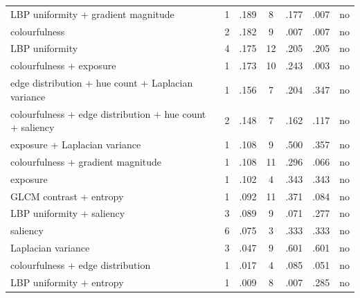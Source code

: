 \begin{table}[!ht]
\begin{tabular}{@{}>{\raggedright\arraybackslash}p{4.9cm}cccccc@{}}
LBP uniformity + gradient magnitude & 1 & .189 & 8 & .177 & .007 & no \\
colourfulness & 2 & .182 & 9 & .007 & .007 & no \\
LBP uniformity & 4 & .175 & 12 & .205 & .205 & no \\
colourfulness + exposure & 1 & .173 & 10 & .243 & .003 & no \\
edge distribution + hue count + Laplacian variance & 1 & .156 & 7 & .204 & .347 & no \\
colourfulness + edge distribution + hue count + saliency & 2 & .148 & 7 & .162 & .117 & no \\
exposure + Laplacian variance & 1 & .108 & 9 & .500 & .357 & no \\
colourfulness + gradient magnitude & 1 & .108 & 11 & .296 & .066 & no \\
exposure & 1 & .102 & 4 & .343 & .343 & no \\
GLCM contrast + entropy & 1 & .092 & 11 & .371 & .084 & no \\
LBP uniformity + saliency & 3 & .089 & 9 & .071 & .277 & no \\
saliency & 6 & .075 & 3 & .333 & .333 & no \\
Laplacian variance & 3 & .047 & 9 & .601 & .601 & no \\
colourfulness + edge distribution & 1 & .017 & 4 & .085 & .051 & no \\
LBP uniformity + entropy & 1 & .009 & 8 & .007 & .285 & no \\
\bottomrule
\end{tabular}
\end{table}

